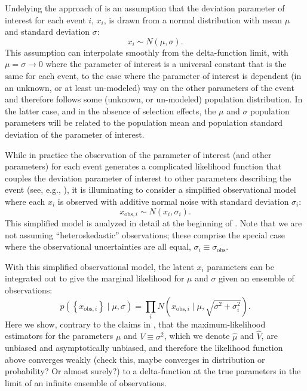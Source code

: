 \documentclass[modern]{aastex631}
\begin{document}
Undelying the approach of \citet{Isi2019} is an assumption that the deviation
parameter of interest for each event $i$, $x_i$, is drawn from a normal
distribution with mean $\mu$ and standard deviation $\sigma$:
\begin{equation}
    x_i \sim N\left( \mu, \sigma \right).
\end{equation}
This assumption can interpolate smoothly from the delta-function limit, with
$\mu = \sigma \to 0$ where the parameter of interest is a universal constant
that is the same for each event, to the case where the parameter of interest is
dependent (in an unknown, or at least un-modeled) way on the other parameters of
the event and therefore follows some (unknown, or un-modeled) population
distribution.  In the latter case, and in the absence of selection effects, the
$\mu$ and $\sigma$ population parameters will be related to the population mean
and population standard deviation of the parameter of interest.

While in practice the observation of the parameter of interest (and other
parameters) for each event generates a complicated likelihood function that
couples the deviation parameter of interest to other parameters describing the
event (see, e.g., \citet{TheLIGOScientificCollaboration2021,Payne2023}), it is
illuminating to consider a simplified observational model where each $x_i$ is
observed with additive normal noise with standard deviation $\sigma_i$:
\begin{equation}
    x_{\mathrm{obs},i} \sim N\left( x_i , \sigma_i \right).
\end{equation}
This simplified model is analyzed in detail at the beginning of
\citet{Pacilio2023}.  Note that we are not assuming ``heteroskedastic''
observations; these comprise the special case where the observational
uncertainties are all equal, $\sigma_i \equiv \sigma_{\mathrm{obs}}$.

With this simplified observational model, the latent $x_i$ parameters can be
integrated out to give the marginal likelihood for $\mu$ and $\sigma$ given an
ensemble of observations:
\begin{equation}
    p\left( \left\{ x_{\mathrm{obs},i} \right\} \mid \mu, \sigma \right) = \prod_i N\left( x_{\mathrm{obs},i} \mid \mu, \sqrt{\sigma^2 + \sigma_i^2} \right).
\end{equation}
Here we show, contrary to the claims in \citet{Pacilio2023}, that the
maximum-likelihood estimators for the parameters $\mu$ and $V \equiv \sigma^2$,
which we denote $\hat{\mu}$ and $\hat{V}$, are unbiased and asymptotically
unbiased, and therefore the likelihood function above converges weakly (check
this, maybe converges in distribution or probability?  Or almost surely?) to a
delta-function at the true parameters in the limit of an infinite ensemble of
observations.
\end{document}
